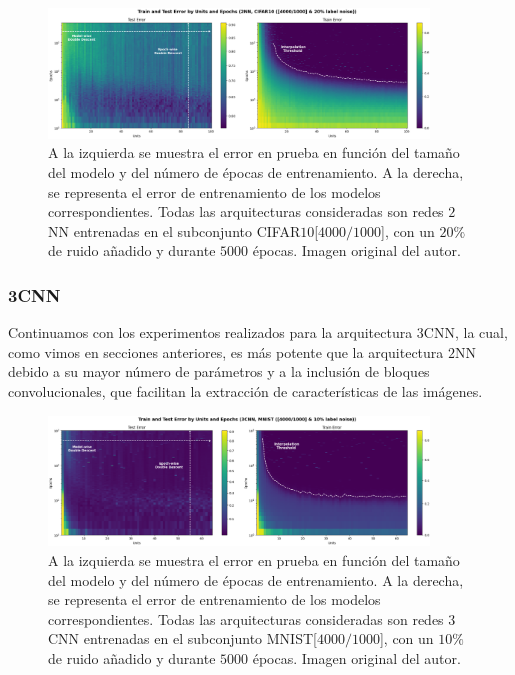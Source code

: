 \begin{figure}[h]
    \centering
    \includegraphics[width=0.9\textwidth]{img/experiments/model-epoch2NNCIFAR10.png}
    \caption[Doble descenso en función del tamaño del modelo y del número de épocas para la red $2$NN y un subconjunto de CIFAR-$10$.]{A la izquierda se muestra el error en prueba en función del tamaño del modelo y del número de épocas de entrenamiento. A la derecha, se representa el error de entrenamiento de los modelos correspondientes. Todas las arquitecturas consideradas son redes $2$NN entrenadas en el subconjunto CIFAR$10$[$4000/1000$], con un $20\%$ de ruido añadido y durante $5000$ épocas. Imagen original del autor.}\label{fig:model-epoch2NNCIFAR10}
\end{figure}

\subsubsection{3CNN}\label{subsubsec:model-epoch-wise-3CNN}

Continuamos con los experimentos realizados para la arquitectura $3$CNN, la cual, como vimos en secciones anteriores, es más potente que la arquitectura $2$NN debido a su mayor número de parámetros y a la inclusión de bloques convolucionales, que facilitan la extracción de características de las imágenes.\newline

\begin{figure}[h]
    \centering
    \includegraphics[width=0.9\textwidth]{img/experiments/model-epoch3CNNMNIST4k.png}
    \caption[Doble descenso en función del tamaño del modelo y del número de épocas para la red $3$CNN y un subconjunto de MNIST.]{A la izquierda se muestra el error en prueba en función del tamaño del modelo y del número de épocas de entrenamiento. A la derecha, se representa el error de entrenamiento de los modelos correspondientes. Todas las arquitecturas consideradas son redes $3$CNN entrenadas en el subconjunto MNIST[$4000/1000$], con un $10\%$ de ruido añadido y durante $5000$ épocas. Imagen original del autor.}\label{fig:model-epoch3CNNMNIST4k}
\end{figure}

